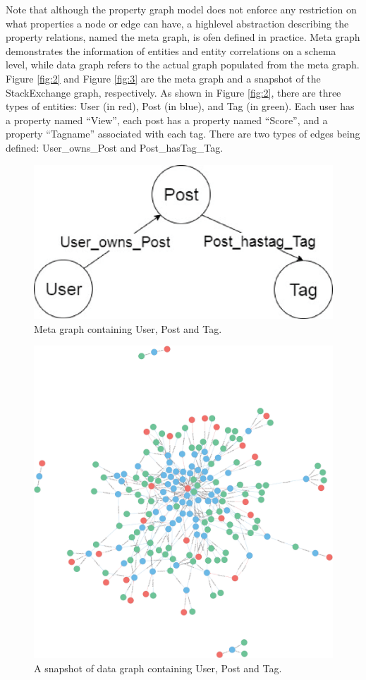Note that although the property graph model does not enforce any restriction on what properties a node or edge can have, a highlevel abstraction describing the property relations, named the meta graph, is ofen defined in practice. Meta graph demonstrates the information of entities and entity correlations on a schema level, while data graph refers to the actual graph populated from the meta graph. Figure \ref{fig:2} and Figure \ref{fig:3} are the meta graph and a snapshot of the StackExchange graph, respectively. As shown in Figure \ref{fig:2}, there are three types of entities: User (in red), Post (in blue), and Tag (in green). Each user has a property named ``View'', each post has a property named ``Score'', and a property ``Tagname'' associated with each tag. There are two types of edges being  defined: User\_owns\_Post and Post\_hasTag\_Tag.


\begin{figure}
\centering
\includegraphics[scale=0.5]{pic/12.eps}
\caption{Meta graph containing User, Post and Tag.}
\end{figure}

\begin{figure}
\centering
\includegraphics[scale=0.1]{pic/3.eps}
\caption{A snapshot of data graph containing User, Post and Tag.}
\end{figure}

